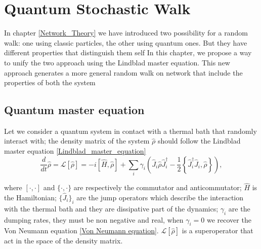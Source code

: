 \chapter{Quantum Stochastic Walk}\label{C_Quantum Stochastic Walk}

In chapter \ref{Network_Theory} we have introduced two possibility for a random walk: one using classic particles, the other using quantum ones. But they have different properties that distinguish them self
In this chapter, we propose a way to unify the two approach using the Lindblad master equation. This new approach generates a more general random walk on network that include the properties of both the system \cite{QSW}

\section{Quantum master equation}
Let we consider a quantum system in contact with a thermal bath that randomly interact with; the density matrix of the system $\hat\rho$ should follow the Lindblad master equation \eqref{Lindblad_master_equation}
\begin{equation}\label{Lindblad_equation_(stoc_chapter)}
    \frac{d}{dt}\hat\rho =\mathcal{L}\left[\hat\rho\right] = -i\left[\hat H,\hat\rho\right] + \sum_i \gamma_i \left(\hat J_i \hat\rho \hat J^\dagger_i - \frac{1}{2}\left\{ \hat J^\dagger_i\hat J_i, \hat\rho\right\} \right),
\end{equation}

where $[\cdot,\cdot]$ and $\{\cdot,\cdot\}$ are respectively the commutator and anticommutator; $\hat H$ is the Hamiltonian; $\{\hat J_i\}_i$ are the jump operators which describe the interaction with the thermal bath and they are dissipative part of the dynamics; $\gamma_i$ are the dumping rates, they must be non negative and real, when $\gamma_i = 0$ we recover the Von Neumann equation \eqref{Von Neumann equation}. $\mathcal{L}\left[\hat\rho\right]$ is a superoperator that act in the space of the density matrix.


